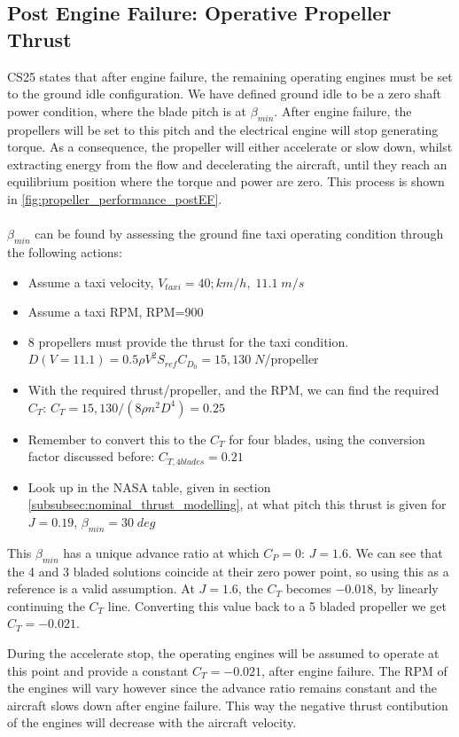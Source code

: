 \subsection{Post Engine Failure: Operative Propeller Thrust}
CS25 states that after engine failure, the remaining operating engines must be set to the ground idle configuration. We have defined ground idle to be a zero shaft power condition, where the blade pitch is at $\beta_{min}$. After engine failure, the propellers will be set to this pitch and the electrical engine will stop generating torque. As a consequence, the propeller will either accelerate or slow down, whilst extracting energy from the flow and decelerating the aircraft, until they reach an equilibrium position where the torque and power are zero. This process is shown in \autoref{fig:propeller_performance_postEF}.\\
\\
$\beta_{min}$ can be found by assessing the ground fine taxi operating condition through the following actions:
\begin{itemize}
    \item Assume a taxi velocity, $V_{taxi}=40;km/h,\;11.1\;m/s$
    \item Assume a taxi RPM, RPM=900
    \item 8 propellers must provide the thrust for the taxi condition. $D(V=11.1)=0.5 \rho V^2 S_{ref} C_{D_0}=15,130\;N$/propeller
    \item With the required thrust/propeller, and the RPM, we can find the required $C_T$: $C_T=15,130/(8 \rho n^2 D^4)=0.25$
    \item Remember to convert this to the $C_T$ for four blades, using the conversion factor discussed before: $C_{T,4 blades}=0.21$
    \item Look up in the NASA table, given in section \autoref{subsubsec:nominal_thrust_modelling}, at what pitch this thrust is given for $J=0.19$, $\beta_{min}=30\;deg$
\end{itemize}

This $\beta_{min}$ has a unique advance ratio at which $C_P=0$: $J=1.6$. We can see that the 4 and 3 bladed solutions coincide at their zero power point, so using this as a reference is a valid assumption. At $J=1.6$, the $C_T$ becomes $-0.018$, by linearly continuing the $C_T$ line. Converting this value back to a 5 bladed propeller we get $C_T=-0.021$. 

During the accelerate stop, the operating engines will be assumed to operate at this point and provide a constant $C_T=-0.021$, after engine failure. The RPM of the engines will vary however since the advance ratio remains constant and the aircraft slows down after engine failure. This way the negative thrust contibution of the engines will decrease with the aircraft velocity.

